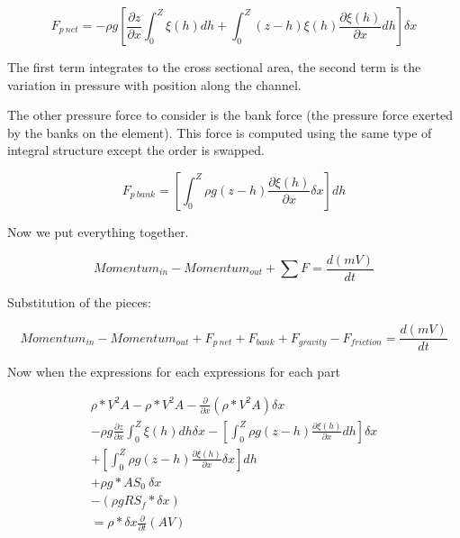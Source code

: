 \begin{equation}
F_{p~net}  = -\rho g [\frac{\partial z}{\partial x}\int_{0}^{Z} \xi(h) dh + \int_{0}^{Z} (z-h) \xi(h) \frac{\partial \xi(h)}{\partial x} dh] \delta x
\end{equation}

The first term integrates to the cross sectional area, the second term is the variation in pressure with position along the channel.

The other pressure force to consider is the bank force (the pressure force exerted by the banks on the element).  This force is computed using the same type of integral structure except the order is swapped.

\begin{equation}
F_{p~bank} =  [\int_{0}^{Z} \rho g (z-h) \frac{\partial \xi(h)}{\partial x} \delta x] dh
\end{equation}

Now we put everything together.

\begin{equation}
{Momentum}_{in}-{Momentum}_{out} + \sum{F} = \frac{d(mV)}{dt}
\end{equation}

Substitution of the pieces:

\begin{equation}
{Momentum}_{in}-{Momentum}_{out} + F_{p~net}+F_{bank} + F_{gravity} - F_{friction}  = \frac{d(mV)}{dt}
\end{equation}

Now when the expressions for each expressions for each part

\begin{equation}
\begin{split}
\rho*V^2A- \rho*V^2A-\frac{\partial}{\partial x}(\rho*V^2A)\delta x  \\
-\rho g \frac{\partial z}{\partial x}\int_{0}^{Z} \xi(h) dh \delta x
- [\int_{0}^{Z}\rho g (z-h)  \frac{\partial \xi(h)}{\partial x} dh] \delta x \\ 
+[\int_{0}^{Z} \rho g (z-h) \frac{\partial \xi(h)}{\partial x} \delta x] dh\\
+\rho g *AS_0~\delta x \\- (\rho g R S_f * \delta x)  \\ =  \rho*\delta x\frac{\partial}{\partial t}(AV)
 \\
\end{split}
\label{eqn:momentum_expanded}
\end{equation}

